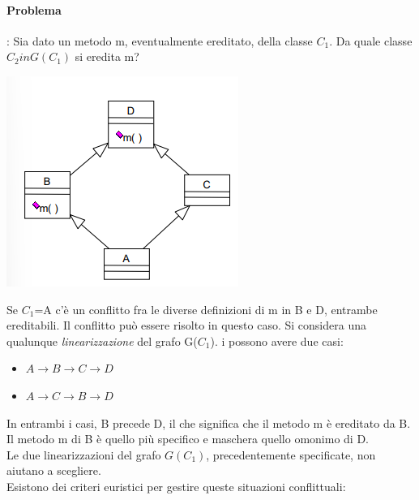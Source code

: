 \documentclass{article}
\begin{document}
	\paragraph*{Problema}: Sia dato un metodo m, eventualmente ereditato, della classe $C_1$. Da quale classe $C_2 in G(C_1)$ si eredita m?
	\begin{center}
		\includegraphics[scale=0.7]{assets/ereditarieta_multipla_problema.png}
	\end{center}
	Se $C_1$=A c'è un conflitto fra le diverse definizioni di m in B e D, entrambe ereditabili. Il conflitto può essere risolto in questo caso. Si considera una qualunque \textit{linearizzazione} del grafo G($C_1$). i possono avere due casi:
	\begin{itemize}
		\item $A \rightarrow B \rightarrow C \rightarrow D$
		\item $A \rightarrow C \rightarrow B \rightarrow D$
	\end{itemize}
	In entrambi i casi, B precede D, il che significa che il metodo m è ereditato da B. Il metodo m di B è quello più specifico e maschera quello omonimo di D. \\
	Le due linearizzazioni del grafo $G(C_1)$, precedentemente specificate, non aiutano a scegliere.
	\vspace{\baselineskip} \\
	Esistono dei criteri euristici per gestire queste situazioni conflittuali:
\end{document}
